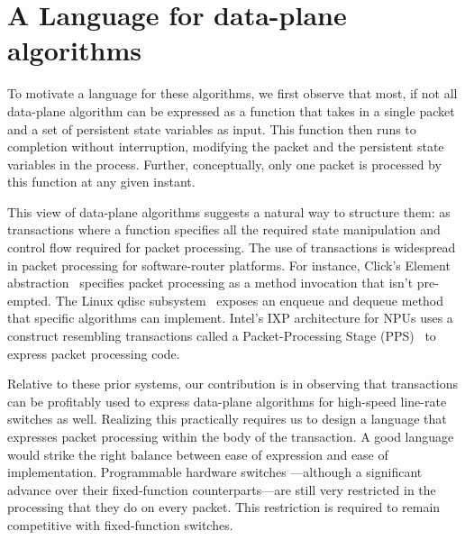 \section{A Language for data-plane algorithms}
\label{s:language}

To motivate a language for these algorithms, we first observe that most, if not all
data-plane algorithm can be expressed as a function that takes in a single
packet and a set of persistent state variables as input. This function then
runs to completion without interruption, modifying the packet and the
persistent state variables in the process. Further, conceptually, only one
packet is processed by this function at any given instant.

This view of data-plane algorithms suggests a natural way to structure them: as
transactions where a function specifies all the required state manipulation and
control flow required for packet processing. The use of transactions is
widespread in packet processing for software-router platforms. For instance,
Click's Element abstraction~\cite{click} specifies packet processing as
a method invocation that isn't pre-empted.  The Linux qdisc
subsystem~\cite{qdisc} exposes an enqueue and dequeue method that specific
algorithms can implement. Intel's IXP architecture for NPUs uses a construct
resembling transactions called a Packet-Processing Stage
(PPS)~\cite{npu} to express packet processing code.

Relative to these prior systems, our contribution is in observing that
transactions can be profitably used to express data-plane algorithms for
high-speed line-rate switches as well. Realizing this practically requires us
to design a language that expresses packet processing within the body of the
transaction. A good language would strike the right balance between ease of
expression and ease of implementation. Programmable hardware switches
---although a significant advance over their fixed-function counterparts---are
still very restricted in the processing that they do on every packet. This
restriction is required to remain competitive with fixed-function switches.

